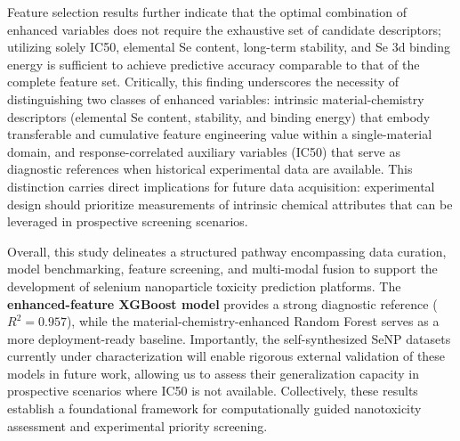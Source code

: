 Feature selection results further indicate that the optimal combination of enhanced variables does not require the exhaustive set of candidate descriptors; utilizing solely IC50, elemental Se content, long-term stability, and Se 3d binding energy is sufficient to achieve predictive accuracy comparable to that of the complete feature set. Critically, this finding underscores the necessity of distinguishing two classes of enhanced variables: intrinsic material-chemistry descriptors (elemental Se content, stability, and binding energy) that embody transferable and cumulative feature engineering value within a single-material domain, and response-correlated auxiliary variables (IC50) that serve as diagnostic references when historical experimental data are available. This distinction carries direct implications for future data acquisition: experimental design should prioritize measurements of intrinsic chemical attributes that can be leveraged in prospective screening scenarios.

Overall, this study delineates a structured pathway encompassing data curation, model benchmarking, feature screening, and multi-modal fusion to support the development of selenium nanoparticle toxicity prediction platforms. The \textbf{enhanced-feature XGBoost model} provides a strong diagnostic reference ($R^2 = 0.957$), while the material-chemistry-enhanced Random Forest serves as a more deployment-ready baseline. Importantly, the self-synthesized SeNP datasets currently under characterization will enable rigorous external validation of these models in future work, allowing us to assess their generalization capacity in prospective scenarios where IC50 is not available. Collectively, these results establish a foundational framework for computationally guided nanotoxicity assessment and experimental priority screening.

